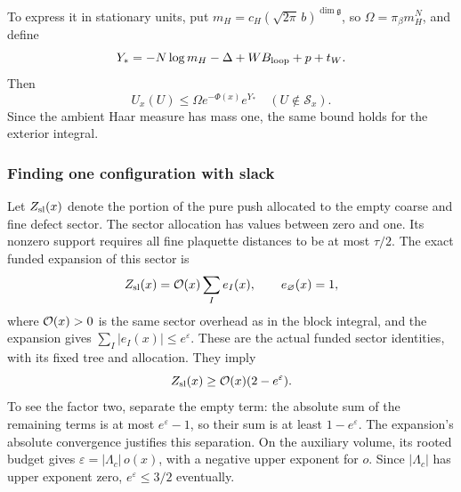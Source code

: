To express it in stationary units, put
$m_H=c_H(\sqrt{2\pi}\,b)^{\dim\mathfrak g}$, so
$\Omega=\pi_\beta m_H^N$, and define
\begin{equation}\label{eq:exterior-exponent}
       Y_*=-N\log m_H-\Delta+WB_{\rm loop}+p+t_W.
\end{equation}
Then
\begin{equation}\label{eq:exterior-pointwise}
 U_x(U)\le\Omega e^{-\Phi(x)}e^{Y_*}
                              \quad(U\notin\mathcal S_x).
\end{equation}
Since the ambient Haar measure has mass one, the same bound holds
for the exterior integral.

\subsubsection{Finding one configuration with slack}
Let $Z_{\rm sl}(x)$ denote the portion of the pure push allocated
to the empty coarse and fine defect sector. The sector allocation
has values between zero and one. Its nonzero support requires
all fine plaquette distances to be at most $\tau/2$.
The exact funded expansion of this sector is
\[
        Z_{\rm sl}(x)={\cal O}(x)\sum_I e_I(x),
        \qquad e_\varnothing(x)=1,
\]
where ${\cal O}(x)>0$ is the same sector overhead as in the block
integral, and the expansion gives
$\sum_I|e_I(x)|\le e^\varepsilon$. These are the actual funded
sector identities, with its fixed tree and allocation. They imply
\begin{equation}\label{eq:exterior-slack-lower}
 Z_{\rm sl}(x)\ge {\cal O}(x)(2-e^\varepsilon).
\end{equation}
To see the factor two, separate the empty term: the absolute sum
of the remaining terms is at most $e^\varepsilon-1$, so their sum
is at least $1-e^\varepsilon$. The expansion's absolute convergence
justifies this separation. On the auxiliary volume, its rooted
budget gives $\varepsilon=|\Lambda_c|\,o(x)$, with a negative upper
exponent for $o$. Since $|\Lambda_c|$ has upper exponent zero,
$e^\varepsilon\le3/2$ eventually.

